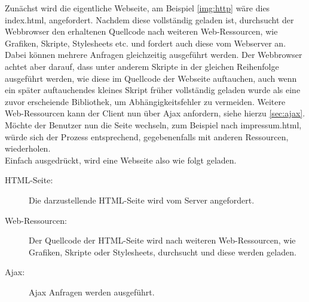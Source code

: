 Zunächst wird die eigentliche Webseite, am Beispiel \autoref{img:http} wäre dies index.html, angefordert. Nachdem diese vollständig geladen ist, durchsucht der Webbrowser den erhaltenen Quellcode nach weiteren Web-Ressourcen, wie Grafiken, Skripte, Stylesheets etc. und fordert auch diese vom Webserver an. Dabei können mehrere Anfragen gleichzeitig ausgeführt werden. Der Webbrowser achtet aber darauf, dass unter anderem Skripte in der gleichen Reihenfolge ausgeführt werden, wie diese im Quellcode der Webseite auftauchen, auch wenn ein später auftauchendes kleines Skript früher vollständig geladen wurde als eine zuvor erscheiende Bibliothek, um Abhängigkeitsfehler zu vermeiden. Weitere Web-Ressourcen kann der Client nun über Ajax anfordern, siehe hierzu \autoref{sec:ajax}. \\
Möchte der Benutzer nun die Seite wechseln, zum Beispiel nach impressum.html, würde sich der Prozess entsprechend, gegebenenfalls mit anderen Ressourcen, wiederholen. \\

Einfach ausgedrückt, wird eine Webseite also wie folgt geladen.

\begin{description}
	\item[HTML-Seite:] Die darzustellende HTML-Seite wird vom Server angefordert.
	\item[Web-Ressourcen:] Der Quellcode der HTML-Seite wird nach weiteren Web-Ressourcen, wie Grafiken, Skripte oder Stylesheets, durchsucht und diese werden geladen.
	\item[Ajax:] Ajax Anfragen werden ausgeführt.
\end{description}